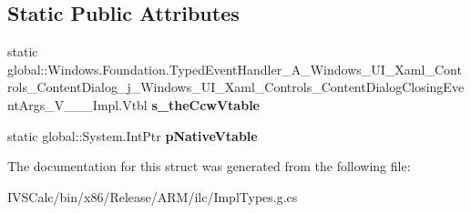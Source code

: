 \subsection*{Static Public Attributes}
\begin{DoxyCompactItemize}
\item 
\mbox{\label{struct_windows_1_1_foundation_1_1_typed_event_handler___a___windows___u_i___xaml___controls___co9111ad08139b8b08fa2d56786ea22dd0_a43c10d2701b106163489d0e7726b0119}} 
static global\+::\+Windows.\+Foundation.\+Typed\+Event\+Handler\+\_\+\+A\+\_\+\+Windows\+\_\+\+U\+I\+\_\+\+Xaml\+\_\+\+Controls\+\_\+\+Content\+Dialog\+\_\+j\+\_\+\+Windows\+\_\+\+U\+I\+\_\+\+Xaml\+\_\+\+Controls\+\_\+\+Content\+Dialog\+Closing\+Event\+Args\+\_\+\+V\+\_\+\+\_\+\+\_\+\+Impl.\+Vtbl {\bfseries s\+\_\+the\+Ccw\+Vtable}
\item 
\mbox{\label{struct_windows_1_1_foundation_1_1_typed_event_handler___a___windows___u_i___xaml___controls___co9111ad08139b8b08fa2d56786ea22dd0_a288a528586a3b676bac18061016188b0}} 
static global\+::\+System.\+Int\+Ptr {\bfseries p\+Native\+Vtable}
\end{DoxyCompactItemize}


The documentation for this struct was generated from the following file\+:\begin{DoxyCompactItemize}
\item 
I\+V\+S\+Calc/bin/x86/\+Release/\+A\+R\+M/ilc/Impl\+Types.\+g.\+cs\end{DoxyCompactItemize}
